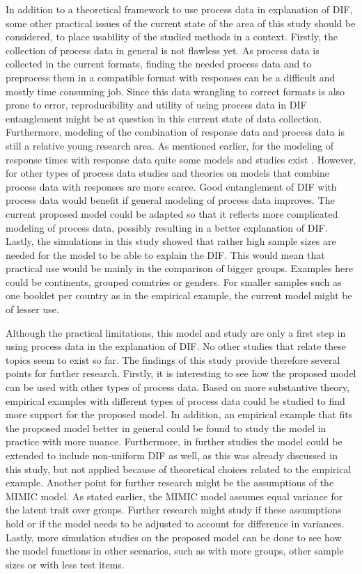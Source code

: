 \documentclass{interact}
\begin{document}
In addition to a theoretical framework to use process data in explanation of DIF, some other practical issues of the current state of the area of this study should be considered, to place usability of the studied methods in a context. Firstly, the collection of process data in general is not flawless yet. As process data is collected in the current formats, finding the needed process data and to preprocess them in a compatible format with responses can be a difficult and mostly time consuming job. Since this data wrangling to correct formats is also prone to error, reproducibility and utility of using process data in DIF entanglement might be at question in this current state of data collection. Furthermore, modeling of the combination of response data and process data is still a relative young research area. As mentioned earlier, for the modeling of response times with response data quite some models and studies exist \parencite{entink2009statistical, molenaar2015generalized, van2007hierarchical}. However, for other types of process data studies and theories on models that combine process data with responses are more scarce. Good entanglement of DIF with process data would benefit if general modeling of process data improves. The current proposed model could be adapted so that it reflects more complicated modeling of process data, possibly resulting in a better explanation of DIF. Lastly, the simulations in this study showed that rather high sample sizes are needed for the model to be able to explain the DIF. This would mean that practical use would be mainly in the comparison of bigger groups. Examples here could be continents, grouped countries or genders. For smaller samples such as one booklet per country as in the empirical example, the current model might be of lesser use.

Although the practical limitations, this model and study are only a first step in using process data in the explanation of DIF. No other studies that relate these topics seem to exist so far. The findings of this study provide therefore several points for further research. Firstly, it is interesting to see how the proposed model can be used with other types of process data. Based on more substantive theory, empirical examples with different types of process data could be studied to find more support for the proposed model. In addition, an empirical example that fits the proposed model better in general could be found to study the model in practice with more nuance. Furthermore, in further studies the model could be extended to include non-uniform DIF as well, as this was already discussed in this study, but not applied because of theoretical choices related to the empirical example. Another point for further research might be the assumptions of the MIMIC model. As stated earlier, the MIMIC model assumes equal variance for the latent trait over groups. Further research might study if these assumptions hold or if the model needs to be adjusted to account for difference in variances. Lastly, more simulation studies on the proposed model can be done to see how the model functions in other scenarios, such as with more groups, other sample sizes or with less test items. 
\end{document}
